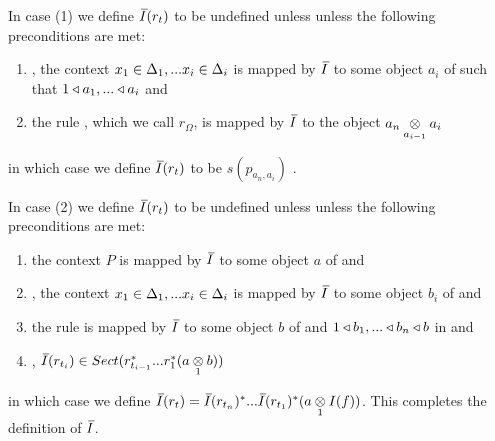 \begin{definition} 
\begin{enumerate}[(i)]
In  case (1) we define $\Ibar(r_t)$ to be undefined unless  unless the following preconditions are met:
\begin{enumerate}
\item
\foreachi, the context $\xDelta{i}$ is mapped by $\Ibar$ to some object $a_i$ of \catcw such
that $1 \base a_1,...\base a_i$ and
\item the rule , which we call $r_\Omega$, is mapped by $\Ibar$ to the object $\crossx{a_n}{a_i}{a_{i-1}}$
\end{enumerate}
in which case we define $\Ibar(r_t)$ to be $s(p_{a_n,a_i})$ . 

In  case (2) 
we define $\Ibar(r_t)$ to be undefined unless  unless the following preconditions are met:
\begin{enumerate}
\item
the context  $P$ is mapped by $\Ibar$ to some object $a$ of \catcw and 
\item
\foreachi, the context $\xDelta{i}$ is mapped by $\Ibar$ to some object $b_i$ of \catcw
and 
\item the rule  is mapped by $\Ibar$ to some object $b$ of \catcw and
$1 \base b_1,...\base b_n \base b$ in \catcw 
and 
\item
\foreachi, $\Ibar(r_{t_i}) \in Sect(r_{t_{i-1}}^*...r_1^* (\crossx{a}{b}{1}))$
\end{enumerate}
in which case we
define $\Ibar(r_t)=\Ibar(r_{t_n})^*...\Ibar(r_{t_1})^*(\crossx{a}{I(f)}{1})$.
This completes the definition of $\Ibar$.
\end{enumerate}
\end{definition}

